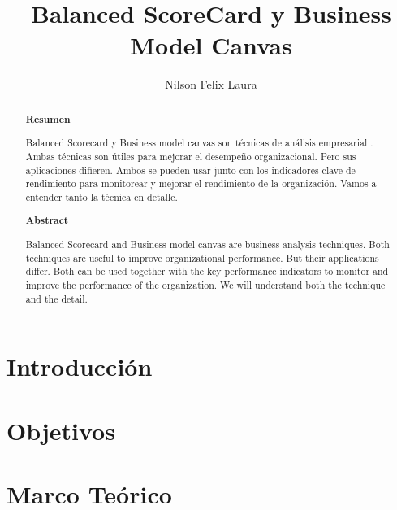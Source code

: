 \documentclass[%
 reprint,
 amsmath,amssymb,
 aps,
]{revtex4-1}
\begin{document}
\title{ Balanced ScoreCard y Business Model Canvas}
\author{Nilson Felix Laura}

%

\begin{abstract}
\begin{center}
\textbf{Resumen}
\end{center}
Balanced Scorecard y Business model canvas son técnicas de análisis empresarial . Ambas técnicas son útiles para mejorar el desempeño organizacional. Pero sus aplicaciones difieren. Ambos se pueden usar junto con los indicadores clave de rendimiento para monitorear y mejorar el rendimiento de la organización. Vamos a entender tanto la técnica en detalle.


\begin{center}
\textbf{Abstract}
\end{center}
Balanced Scorecard and Business model canvas are business analysis techniques. Both techniques are useful to improve organizational performance. But their applications differ. Both can be used together with the key performance indicators to monitor and improve the performance of the organization. We will understand both the technique and the detail.

\end{abstract}



\maketitle


\section {Introducción}



\section {Objetivos}


\section {Marco Teórico}
\end{document}
